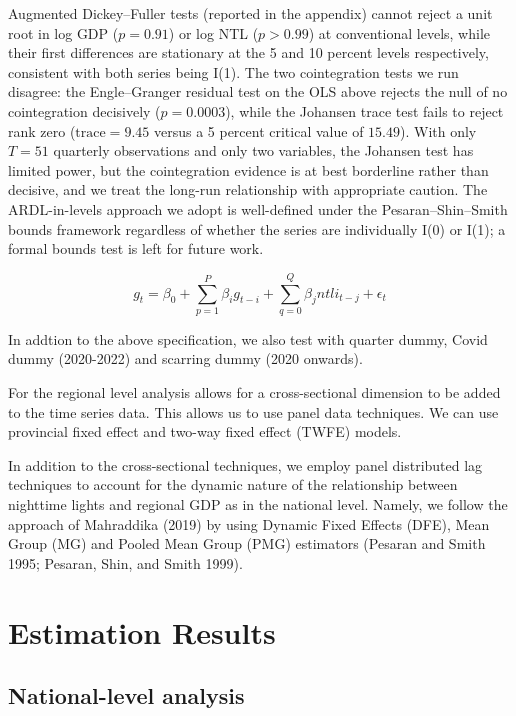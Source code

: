 \documentclass[
  manuscript=article,
  layout=publish,
  year=2026,
  volume=3,
]{den}
\begin{document}
Augmented Dickey--Fuller tests (reported in the appendix) cannot reject
a unit root in log GDP (\(p = 0.91\)) or log NTL (\(p > 0.99\)) at
conventional levels, while their first differences are stationary at the
5 and 10 percent levels respectively, consistent with both series being
I(1). The two cointegration tests we run disagree: the Engle--Granger
residual test on the OLS above rejects the null of no cointegration
decisively (\(p = 0.0003\)), while the Johansen trace test fails to
reject rank zero (\(\text{trace} = 9.45\) versus a 5 percent critical
value of \(15.49\)). With only \(T = 51\) quarterly observations and
only two variables, the Johansen test has limited power, but the
cointegration evidence is at best borderline rather than decisive, and
we treat the long-run relationship with appropriate caution. The
ARDL-in-levels approach we adopt is well-defined under the
Pesaran--Shin--Smith bounds framework regardless of whether the series
are individually I(0) or I(1); a formal bounds test is left for future
work.

\[
g_t=\beta_0+\sum_{p=1}^{P}\beta_i g_{t-i}+\sum_{q=0}^{Q}\beta_j ntli_{t-j}+\epsilon_t
\]

In addtion to the above specification, we also test with quarter dummy,
Covid dummy (2020-2022) and scarring dummy (2020 onwards).

For the regional level analysis allows for a cross-sectional dimension
to be added to the time series data. This allows us to use panel data
techniques. We can use provincial fixed effect and two-way fixed effect
(TWFE) models.

In addition to the cross-sectional techniques, we employ panel
distributed lag techniques to account for the dynamic nature of the
relationship between nighttime lights and regional GDP as in the
national level. Namely, we follow the approach of Mahraddika (2019) by
using Dynamic Fixed Effects (DFE), Mean Group (MG) and Pooled Mean Group
(PMG) estimators (Pesaran and Smith 1995; Pesaran, Shin, and Smith
1999).

\section{Estimation Results}\label{estimation-results}

\subsection{National-level analysis}\label{national-level-analysis}
\end{document}
